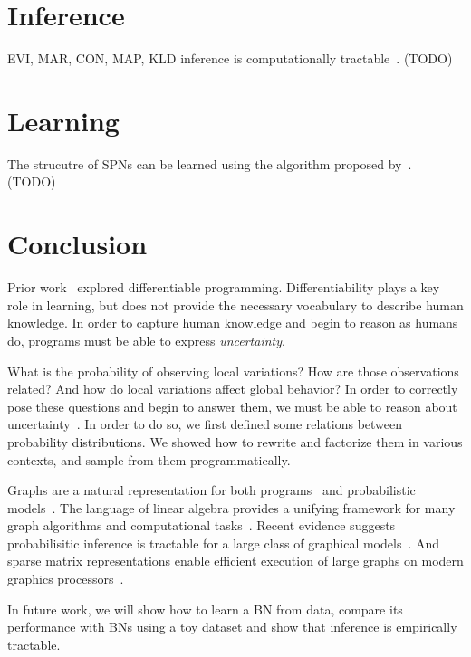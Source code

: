 \documentclass{article}
\begin{document}


\section{Inference}

EVI, MAR, CON, MAP, KLD inference is computationally tractable~\citep{choi2020probabilistic}. (TODO)

\section{Learning}

The strucutre of SPNs can be learned using the algorithm proposed by~\citet{gens2013learning}. (TODO)


\section{Conclusion}

Prior work~\citep{considine2019kotlingrad,considine2019programming} explored differentiable programming. Differentiability plays a key role in learning, but does not provide the necessary vocabulary to describe human knowledge. In order to capture human knowledge and begin to reason as humans do, programs must be able to express \textit{uncertainty}.

What is the probability of observing local variations? How are those observations related? And how do local variations affect global behavior? In order to correctly pose these questions and begin to answer them, we must be able to reason about uncertainty~\citep{pearl2014probabilistic}. In order to do so, we first defined some relations between probability distributions. We showed how to rewrite and factorize them in various contexts, and sample from them programmatically.

Graphs are a natural representation for both programs~\citep{allamanis2017learning} and probabilistic models~\citep{pearl2014probabilistic}. The language of linear algebra provides a unifying framework for many graph algorithms and computational tasks~\citep{kepner2011graph}. Recent evidence suggests probabilisitic inference is tractable for a large class of graphical models~\citep{choi2020probabilistic}. And sparse matrix representations enable efficient execution of large graphs on modern graphics processors~\citep{kepner2016mathematical}.

In future work, we will show how to learn a BN from data, compare its performance with BNs using a toy dataset and show that inference is empirically tractable.


\end{document}
